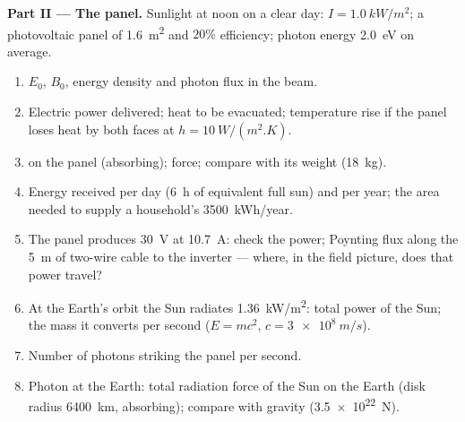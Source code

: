 \begin{problem}
\medskip
\noindent\textbf{Part II --- The panel.}
Sunlight at noon on a clear day: $I = \qty{1.0}{kW/m^2}$; a photovoltaic
panel of \qty{1.6}{m^2} and $20\%$ efficiency; photon energy \qty{2.0}{eV}
on average.
\begin{enumerate}[resume]
  \item $E_0$, $B_0$, energy density and photon flux in the beam.
  \item Electric power delivered; heat to be evacuated; temperature
        rise if the panel loses heat by both faces at $h = \qty{10}{W/(m^2.K)}$.
  \item {} on the panel (absorbing); force; compare
        with its weight (\qty{18}{kg}).
  \item Energy received per day (\qty{6}{h} of equivalent full sun) and
        per year; the area needed to supply a household's
        \qty{3500}{kWh/year}.
  \item The panel produces \qty{30}{V} at \qty{10.7}{A}: check the power;
        Poynting flux along the \qty{5}{m} of two-wire cable to the
        inverter --- where, in the field picture, does that power
        travel?
  \item At the Earth's orbit the Sun radiates \qty{1.36}{kW/m^2}: total
        power of the Sun; the mass it converts per second ($E = mc^2$,
        $c = \qty{3e8}{m/s}$).
  \item Number of photons striking the panel per second.
  \item Photon  at the Earth: total radiation force of the
        Sun on the Earth (disk radius \qty{6400}{km}, absorbing);
        compare with gravity (\qty{3.5e22}{N}).
\end{enumerate}


\end{problem}
